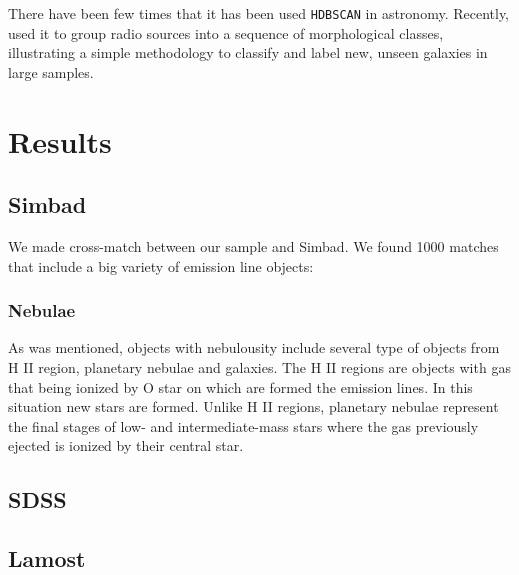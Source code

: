 \documentclass[fleqn,usenatbib]{mnras}
\begin{document}
There have been few times that it has been used \texttt{HDBSCAN} in astronomy.
Recently, \citet{Ntwaetsile:2021} used it to group radio sources into a sequence
of morphological classes, illustrating a simple methodology to classify and
label new, unseen galaxies in large samples.

\section{Results}
\label{sec:results}

\subsection{Simbad}

We made cross-match between our sample and Simbad. We found 1000
matches that include a big variety of emission line objects:

\subsubsection{Nebulae}

As was mentioned, objects with nebulousity include several
type of objects from H II region, planetary nebulae and galaxies.
The H II regions are objects with gas that being ionized by
O star on which are formed the emission lines. In this situation new
stars are formed. Unlike H II regions, planetary nebulae
represent the final stages of low- and intermediate-mass stars
where the gas previously ejected is ionized by their central star.


\subsection{SDSS}

\subsection{Lamost}
\end{document}
